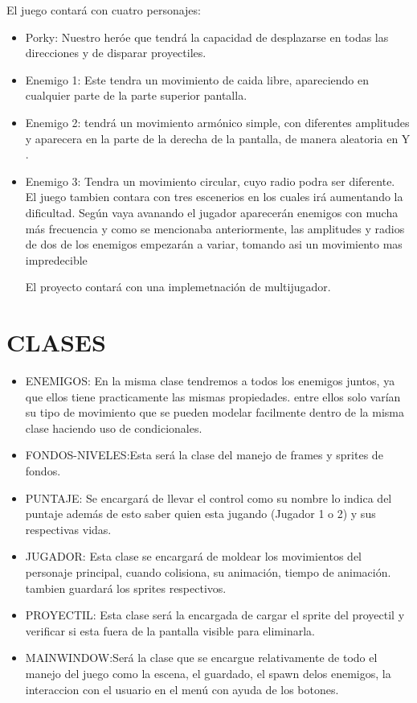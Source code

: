\documentclass{article}
\begin{document}
El juego contará con cuatro personajes:
\begin{itemize}
\item Porky: Nuestro heróe que tendrá la capacidad de desplazarse en todas las direcciones y de disparar proyectiles.\\
\item Enemigo 1: Este tendra un movimiento de caida libre, apareciendo en cualquier parte de la parte superior pantalla.\\
\item Enemigo 2: tendrá un movimiento armónico simple, con diferentes amplitudes y aparecera en la parte de la derecha de la pantalla, de manera aleatoria en Y  .\\
\item Enemigo 3: Tendra un movimiento circular, cuyo radio podra ser diferente.\\

El juego tambien contara con tres escenerios en los cuales irá aumentando la dificultad. Según vaya avanando el jugador aparecerán enemigos con mucha más frecuencia y como se mencionaba anteriormente, las amplitudes y radios de dos de los enemigos empezarán a variar, tomando asi un movimiento mas impredecible

El proyecto contará con una implemetnación de multijugador.



\end{itemize}
\newpage
\section{CLASES}
\begin{itemize}
\item ENEMIGOS: En la misma clase tendremos a todos los enemigos juntos, ya que ellos tiene practicamente las mismas propiedades. entre ellos solo varían su tipo de movimiento que se pueden modelar facilmente dentro de la misma clase haciendo uso de condicionales.\\
\item FONDOS-NIVELES:Esta será la clase del manejo de frames y sprites de fondos.\\
\item PUNTAJE: Se encargará de llevar el control como su nombre lo indica del puntaje además de esto saber quien esta jugando (Jugador 1 o 2) y sus respectivas vidas.\\
\item JUGADOR: Esta clase se encargará de moldear los movimientos del personaje principal, cuando colisiona, su animación, tiempo de animación. tambien guardará los sprites respectivos.\\ 
\item PROYECTIL: Esta clase será la encargada de cargar el sprite del proyectil y verificar si esta fuera de la pantalla visible para eliminarla.\\
\item MAINWINDOW:Será la clase que se encargue relativamente de todo el manejo del juego como la escena, el guardado, el spawn delos enemigos, la interaccion con el usuario en el menú con ayuda de los botones.

\end{itemize}
\newpage
\end{document}
